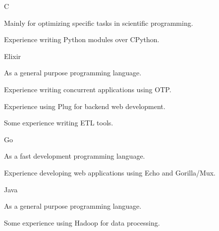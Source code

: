 


\begin{cvskills}


\cvskill
{C} %
{
  \begin{cvitems}
  \item {Mainly for optimizing specific tasks in scientific programming.}
  \item {Experience writing Python modules over CPython.}
  \end{cvitems}
}


\cvskill
{Elixir} %
{
  \begin{cvitems}
  \item {As a general purpose programming language.}
  \item {Experience writing concurrent applications using OTP.}
  \item {Experience using Plug for backend web development.}
  \item {Some experience writing ETL tools.}
  \end{cvitems}
}


\cvskill
{Go} %
{
  \begin{cvitems}
  \item {As a fast development programming language.}
  \item {Experience developing web applications using Echo and Gorilla/Mux.} 
  \end{cvitems}
}


\cvskill
{Java} %
{
  \begin{cvitems}
  \item {As a general purpose programming language.}
  \item {Some experience using Hadoop for data processing.}
  \end{cvitems}
}


\end{cvskills}
